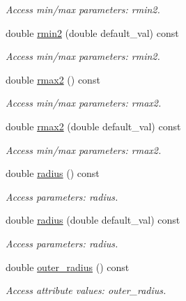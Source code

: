 \begin{DoxyCompactItemize}
\begin{DoxyCompactList}\small\item\em Access min/max parameters: rmin2. \item\end{DoxyCompactList}\item 
double \hyperlink{struct_d_d4hep_1_1_x_m_l_1_1_dimension_aed3c20406e5bd0bee9b4043475c10e3e}{rmin2} (double default\_\-val) const 
\begin{DoxyCompactList}\small\item\em Access min/max parameters: rmin2. \item\end{DoxyCompactList}\item 
double \hyperlink{struct_d_d4hep_1_1_x_m_l_1_1_dimension_ab09b37511fc146efb96b25b19a56ae3a}{rmax2} () const 
\begin{DoxyCompactList}\small\item\em Access min/max parameters: rmax2. \item\end{DoxyCompactList}\item 
double \hyperlink{struct_d_d4hep_1_1_x_m_l_1_1_dimension_a0611984843d83b2c40c35c8f0d38ce37}{rmax2} (double default\_\-val) const 
\begin{DoxyCompactList}\small\item\em Access min/max parameters: rmax2. \item\end{DoxyCompactList}\item 
double \hyperlink{struct_d_d4hep_1_1_x_m_l_1_1_dimension_adcc00f73aeb47222beb5fc99c6d071ef}{radius} () const 
\begin{DoxyCompactList}\small\item\em Access parameters: radius. \item\end{DoxyCompactList}\item 
double \hyperlink{struct_d_d4hep_1_1_x_m_l_1_1_dimension_a6d63de717ac5aac8dcdc20b79fd3b87d}{radius} (double default\_\-val) const 
\begin{DoxyCompactList}\small\item\em Access parameters: radius. \item\end{DoxyCompactList}\item 
double \hyperlink{struct_d_d4hep_1_1_x_m_l_1_1_dimension_a004fb16b87208f351d1a8a35fc641afe}{outer\_\-radius} () const 
\begin{DoxyCompactList}\small\item\em Access attribute values: outer\_\-radius. \item\end{DoxyCompactList}\item 

\end{DoxyCompactItemize}
